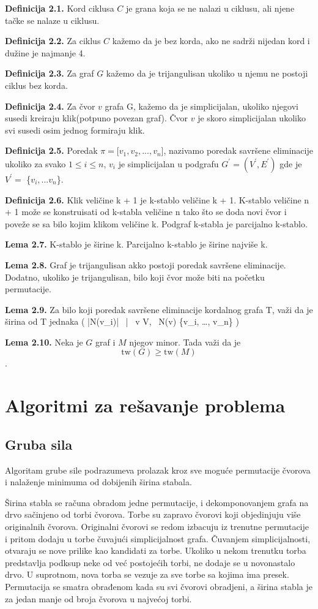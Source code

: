 \documentclass[10pt]{article}
\begin{document}
\textbf{Definicija 2.1.} Kord ciklusa $C$ je grana koja se ne nalazi u ciklusu, ali njene tačke se nalaze u ciklusu.

\textbf{Definicija 2.2.} Za ciklus $C$ kažemo da je bez korda, ako ne sadrži nijedan kord i dužine je najmanje 4.

\textbf{Definicija 2.3.} Za graf $G$ kažemo da je trijangulisan ukoliko u njemu ne postoji ciklus bez korda.

\textbf{Definicija 2.4.} Za čvor $v$ grafa G, kažemo da je simplicijalan, ukoliko njegovi susedi kreiraju klik(potpuno povezan graf). Čvor $v$ je skoro simplicijalan ukoliko svi susedi osim jednog formiraju klik.

\textbf{Definicija 2.5.} Poredak $\pi=$[$v_1,v_2,...,v_n$], nazivamo poredak savršene eliminacije ukoliko za svako $1\leq i \leq n$, $v_i$ je simplicijalan u podgrafu ${G^'} = ({V^'}, {E^'})$ gde je ${V^'} =$ \{$v_i,...v_n$\}.

\textbf{Definicija 2.6.} Klik veličine k + 1 je k-stablo veličine  k + 1. K-stablo veličine n + 1 može se konstruisati od k-stabla veličine n tako što se doda novi čvor i poveže se sa bilo kojim klikom veličine k. Podgraf k-stabla je parcijalno k-stablo.

\textbf{Lema 2.7.} K-stablo je širine k. Parcijalno k-stablo je širine najviše k.

\textbf{Lema 2.8.} Graf je trijangulisan akko postoji poredak savršene eliminacije. Dodatno, ukoliko je trijangulisan, bilo koji čvor može biti na početku permutacije.

\textbf{Lema 2.9.} Za bilo koji poredak savršene eliminacije kordalnog grafa T, važi da je širina od T jednaka \max \left( |N(v_i)| \, \big| \, v \in V, \, N(v) \cap \{v_i, \ldots, v_n\} \right)

\textbf{Lema 2.10.} Neka je $G$ graf i $M$ njegov minor. Tada važi da je \[\text{tw}(G) \geq \text{tw}(M)\].




\section{Algoritmi za rešavanje problema}
\subsection{Gruba sila}
Algoritam grube sile podrazumeva prolazak kroz sve moguće permutacije čvorova i nalaženje minimuma od dobijenih širina stabala.

Širina stabla se računa obradom jedne permutacije, i dekomponovanjem grafa na drvo sačinjeno od torbi čvorova. Torbe su zapravo čvorovi koji objedinjuju više originalnih čvorova. Originalni čvorovi se redom izbacuju iz trenutne permutacije i pritom dodaju u torbe čuvajući simplicijalnost grafa. Čuvanjem simplicijalnosti, otvaraju se nove prilike kao kandidati za torbe. Ukoliko u nekom trenutku torba predstavlja podksup neke od već postojećih torbi, ne dodaje se u novonastalo drvo. U suprotnom, nova torba se vezuje za sve torbe sa kojima ima presek. Permutacija se smatra obrađenom kada su svi čvorovi obradjeni, a širina stabla je za jedan manje od broja čvorova u najvećoj torbi.
\end{document}
